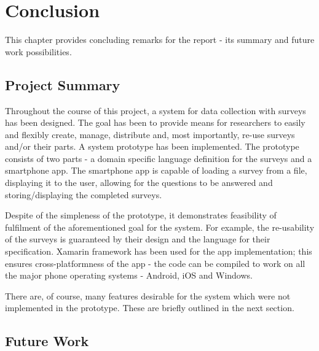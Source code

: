 \chapter{Conclusion}
\label{chap:conclusion}
This chapter provides concluding remarks for the report - its summary and future work possibilities.

\section{Project Summary}
\label{sec:summary}
Throughout the course of this project, a system for data collection with surveys has been designed. The goal has been to provide means for researchers to easily and flexibly create, manage, distribute and, most importantly, re-use surveys and/or their parts. 
A system prototype has been implemented. The prototype consists of two parts - a domain specific language definition for the surveys and a smartphone app. The smartphone app is capable of loading a survey from a file, displaying it to the user, allowing for the questions to be answered and storing/displaying the completed surveys.

Despite of the simpleness of the prototype, it demonstrates feasibility of fulfilment of the aforementioned goal for the system. For example, the re-usability of the surveys is guaranteed by their design and the language for their specification. Xamarin framework has been used for the app implementation; this ensures cross-platformness of the app - the code can be compiled to work on all the major phone operating systems - Android, iOS and Windows.

There are, of course, many features desirable for the system which were not implemented in the prototype. These are briefly outlined in the next section.

\section{Future Work}
\label{sec:futurework}
